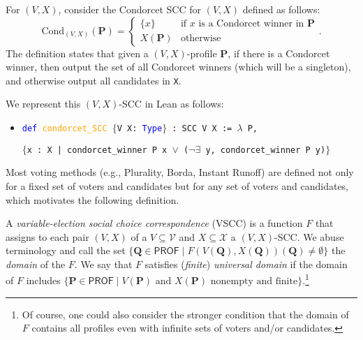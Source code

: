 \documentclass[runningheads]{llncs}
\begin{document}

\begin{example}\label{CondorcetEx1} For $(V,X)$, consider the Condorcet SCC for $(V,X)$ defined as follows:
\[\mathrm{Cond}_{(V,X)}(\mathbf{P})=\begin{cases} \{x\} & \mbox{if $x$ is a Condorcet winner in $\mathbf{P}$} \\ X(\mathbf{P}) & \mbox{otherwise}\end{cases}.\]
The definition states that given a $(V,X)$-profile $\mathbf{P}$, if there is a Condorcet winner, then output the set of all Condorcet winners (which will be a singleton), and otherwise output all candidates in \texttt{X}.

We represent this $(V,X)$-SCC in Lean as follows:
\begin{itemize}
\item[] \texttt{\textcolor{blue}{def} \textcolor{orange}{condorcet\_SCC} $\{$V X: \textcolor{blue}{Type}$\}$ : SCC V X := $\lambda$ P, }

\texttt{$\{$x : X |  condorcet\_winner P x $\vee$ ($\neg \exists$ y, condorcet\_winner P y)$\}$}
\end{itemize}
\end{example}

Most voting methods (e.g., Plurality, Borda, Instant Runoff) are defined not only for a fixed set of voters and candidates but for any set of voters and candidates, which motivates the following definition.

\begin{definition}\label{VSCC} \textnormal{A \textit{variable-election social choice correspondence} (VSCC) is a function $F$ that assigns to each pair $(V,X)$ of a $V\subseteq \mathcal{V}$ and $X\subseteq\mathcal{X}$ a $(V,X)$-SCC. We abuse terminology and call the set $\{\mathbf{Q}\in\mathsf{PROF}\mid F(V(\mathbf{Q}),X(\mathbf{Q}))(\mathbf{Q})\neq\emptyset \}$ the \textit{domain} of the $F$. We say that $F$ satisfies  (\textit{finite}) \textit{universal domain} if the domain of $F$ includes $\{\mathbf{P}\in \mathsf{PROF}\mid V(\mathbf{P}) \mbox{ and }X(\mathbf{P}) \mbox{ nonempty and finite}\}$.}\footnote{Of course, one could also consider the stronger condition that the domain of $F$ contains all profiles even with infinite sets of voters and/or candidates.}
\end{definition}
\end{document}
